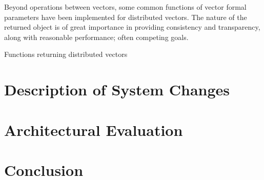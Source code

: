 \documentclass[a4paper,10pt]{article}
\begin{document}
Beyond operations between vectors, some common functions of vector formal
parameters have been implemented for distributed vectors.
The nature of the returned object is of great importance in providing
consistency and transparency, along with reasonable performance; often
competing goals.

Functions returning distributed vectors



\section{Description of System Changes}

\section{Architectural Evaluation}

\section{Conclusion}
\end{document}
